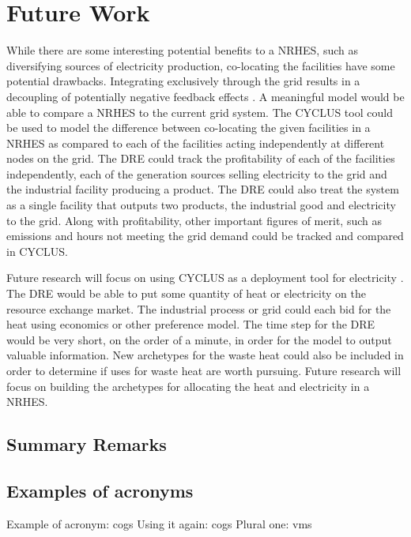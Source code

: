 \documentclass[12pt]{UIdahoMastersThesis}
\begin{document}
\chapter{Future Work}
While there are some interesting potential benefits to a NRHES, such as diversifying sources of electricity production, co-locating the facilities have some potential drawbacks.  Integrating exclusively through the grid results in a decoupling of potentially negative feedback effects \cite{Harrison2016}.  A meaningful model would be able to compare a NRHES to the current grid system. The CYCLUS tool could be used to model the difference between co-locating the given facilities in a NRHES as compared to each of the facilities acting independently at different nodes on the grid.  The DRE could track the profitability of each of the facilities independently, each of the generation sources selling electricity to the grid and the industrial facility producing a product.  The DRE could also treat the system as a single facility that outputs two products, the industrial good and electricity to the grid. Along with profitability, other important figures of merit, such as emissions and hours not meeting the grid demand could be tracked and compared in CYCLUS. 

Future research will focus on using CYCLUS as a deployment tool for electricity \cite{redfoot_rabiti_2017}. The DRE would be able to put some quantity of heat or electricity on the resource exchange market.  The industrial process or grid could each bid for the heat using economics or other preference model.  The time step for the DRE would be very short, on the order of a minute, in order for the model to output valuable information.
 New archetypes for the waste heat could also be included in order to determine if uses for waste heat are worth pursuing.  Future research will focus on building the archetypes for allocating the heat and electricity in a NRHES.
\section{Summary Remarks}
 

\section{Examples of acronyms}
Example of acronym: \ac{cogs}
Using it again: \ac{cogs}
Plural one: \acp{vm}

\end{document}
